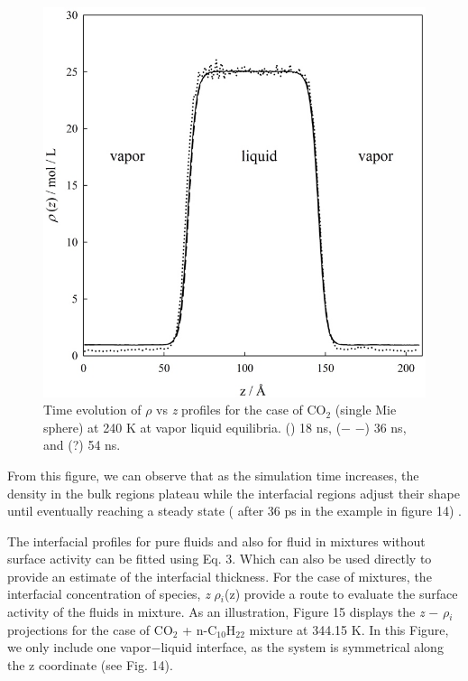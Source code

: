 \documentclass{scrbook}
\begin{document}
\begin{figure}
\includegraphics[width=1\textwidth]{gfx/image53.jpeg}
\caption{Time evolution of {${\rho}$} vs \textit{z} profiles for the case of CO$_{2}$ (single Mie sphere) at 240 K at vapor \textendash{} liquid equilibria. ({\textbullet}{\textbullet}{\textbullet}) 18 ns, (${-}$ ${-}$) 36 ns, and (?) 54 ns.}
\label{fig:8}
\end{figure}

From this figure, we can observe that as the simulation time increases, the
density in the bulk regions plateau while the interfacial regions adjust their
shape until eventually reaching a steady state ( after 36 ps in the example in
figure 14) . 

The interfacial profiles for pure fluids and also for fluid in mixtures without
surface activity can be fitted using Eq. 3. Which can also be used directly to
provide an estimate of the interfacial thickness. For the case of mixtures, the
interfacial concentration of species, \textit{z} \textendash{}
{${\rho}$}$_{i}$(z) provide a route to evaluate the surface activity of the
fluids in mixture. As an illustration, Figure 15 displays the \textit{z} ${-}$
${\rho}$$_{i}$ projections for the case of CO$_{2}$ + n-C$_{10}$H$_{22}$
mixture at 344.15 K. In this Figure, we only include one vapor${-}$liquid
interface, as the system is symmetrical along the z coordinate (see Fig. 14). 
\end{document}
